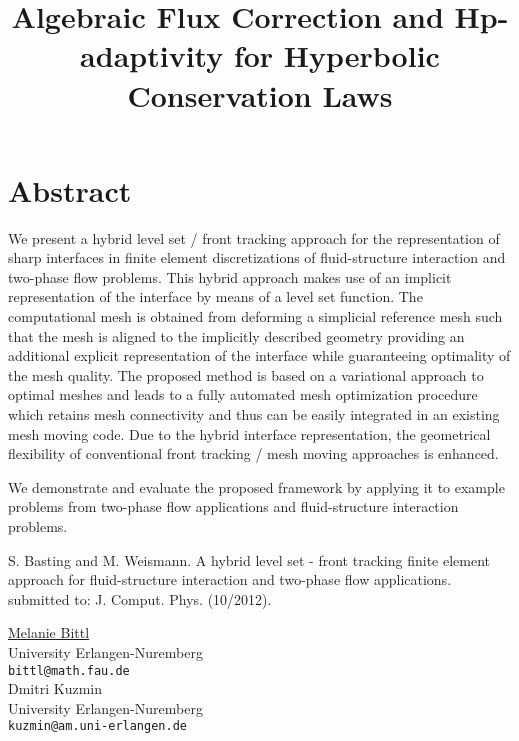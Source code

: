 \documentclass[article,A4,11pt]{llncs}%
\begin{document}
\section*{Abstract}
We present a hybrid level set / front tracking approach for the representation of sharp interfaces in finite element discretizations of fluid-structure interaction and two-phase flow problems. This hybrid approach makes use of an implicit representation of the interface by means of a level set function. The computational mesh is obtained from deforming a simplicial reference mesh such that the mesh is aligned to the implicitly described geometry providing an additional explicit representation of the interface while guaranteeing optimality of the mesh quality. The proposed method is based on a variational approach to optimal meshes and leads to a fully automated mesh optimization procedure which retains mesh connectivity and thus can be easily integrated in an existing mesh moving code. Due to the hybrid interface representation, the geometrical flexibility of conventional front tracking / mesh moving approaches is enhanced.

  We demonstrate and evaluate the proposed framework by applying it to example problems from two-phase flow applications and fluid-structure interaction problems.



\begin{thebibliography}{10}
{\sc S. Basting and M. Weismann}. {A hybrid level set - front tracking finite element approach for fluid-structure interaction and two-phase flow applications}. submitted to: J. Comput. Phys. (10/2012).
\end{thebibliography}

\title{Algebraic Flux Correction and Hp-adaptivity for Hyperbolic Conservation Laws}
 \author{} \institute{}
\maketitle
\begin{center}
{\large \underline{Melanie Bittl}}\\
University Erlangen-Nuremberg\\
{\tt bittl@math.fau.de}
\\ \vspace{4mm}
{\large Dmitri Kuzmin}\\
University Erlangen-Nuremberg\\
{\tt kuzmin@am.uni-erlangen.de}
\end{center}
\end{document}
